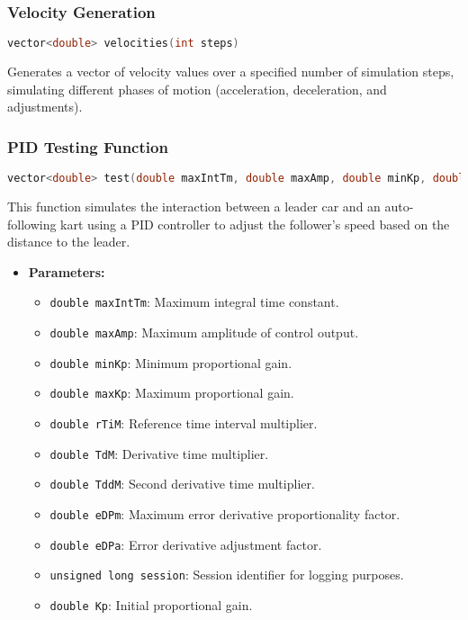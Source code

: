 \documentclass[a4paper,12pt]{report}
\begin{document}
\begin{lstlising}[language=C++]
\subsubsection{Velocity Generation}
\begin{lstlisting}[language=cpp]
vector<double> velocities(int steps)
\end{lstlisting}
Generates a vector of velocity values over a specified number of simulation steps, simulating different phases of motion (acceleration, deceleration, and adjustments).
\subsubsection{PID Testing Function}
\begin{lstlisting}[language=cpp]
vector<double> test(double maxIntTm, double maxAmp, double minKp, double maxKp, double rTiM, double TdM, double TddM, double eDPm, double eDPa, unsigned long session, double Kp, double preE = 0, unsigned long preT = 0, double timeInterval = 10, int steps = 1000)
\end{lstlisting}
This function simulates the interaction between a leader car and an auto-following kart using a PID controller to adjust the follower's speed based on the distance to the leader.
\begin{itemize}
\item \textbf{Parameters:}
\begin{itemize}
\item \texttt{double maxIntTm}: Maximum integral time constant.
\item \texttt{double maxAmp}: Maximum amplitude of control output.
\item \texttt{double minKp}: Minimum proportional gain.
\item \texttt{double maxKp}: Maximum proportional gain.
\item \texttt{double rTiM}: Reference time interval multiplier.
\item \texttt{double TdM}: Derivative time multiplier.
\item \texttt{double TddM}: Second derivative time multiplier.
\item \texttt{double eDPm}: Maximum error derivative proportionality factor.
\item \texttt{double eDPa}: Error derivative adjustment factor.
\item \texttt{unsigned long session}: Session identifier for logging purposes.
\item \texttt{double Kp}: Initial proportional gain.

\end{itemize}
\end{itemize}
\end{lstlising}
\end{document}

